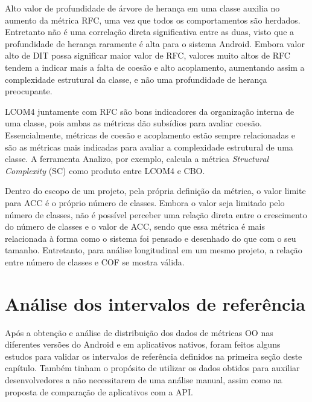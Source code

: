Alto valor de profundidade de árvore de herança em uma classe auxilia no aumento da métrica RFC, uma vez que todos os comportamentos são herdados. Entretanto não é uma correlação direta significativa entre as duas, visto que a profundidade de herança raramente é alta para o sistema Android. Embora valor alto de DIT possa significar maior valor de RFC, valores muito altos de RFC tendem a indicar mais a falta de coesão e alto acoplamento, aumentando assim a complexidade estrutural da classe, e não uma profundidade de herança preocupante.

LCOM4 juntamente com RFC são bons indicadores da organização interna de uma classe, pois ambas as métricas dão subsídios para avaliar coesão. Essencialmente, métricas de coesão e acoplamento estão sempre relacionadas e são as métricas mais indicadas para avaliar a complexidade estrutural de uma classe. A ferramenta Analizo, por exemplo, calcula a métrica \textit{Structural Complexity} (SC) como produto entre LCOM4 e CBO.


Dentro do escopo de um projeto, pela própria definição da métrica, o valor limite para ACC é o próprio número de classes. Embora o valor seja limitado pelo número de classes, não é possível perceber uma relação direta entre o crescimento do número de classes e o valor de ACC, sendo que essa métrica é mais relacionada à forma como o sistema foi pensado e desenhado do que com o seu tamanho. Entretanto, para análise longitudinal em um mesmo projeto, a relação entre número de classes e COF se mostra válida.

\section{Análise dos intervalos de referência}

Após a obtenção e análise de distribuição dos dados de métricas OO nas diferentes versões do Android e em aplicativos nativos, foram feitos alguns estudos para validar os intervalos de referência definidos na primeira seção deste capítulo. Também tinham o propósito de utilizar os dados obtidos para auxiliar desenvolvedores a não necessitarem de uma análise manual, assim como na proposta de comparação de aplicativos com a API.

